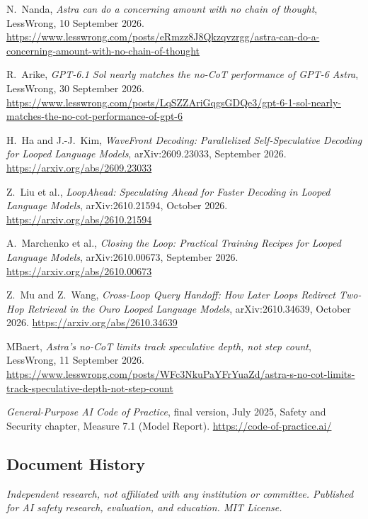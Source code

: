 \documentclass[11pt,letterpaper]{article}
\begin{document}
\begin{enumerate}[label={\textcolor{deepindigo}{[\arabic*]}}, leftmargin=2.6em, itemsep=0.3em]
  \item N.~Nanda, \emph{Astra can do a concerning amount with no chain of thought}, LessWrong, 10 September 2026. \url{https://www.lesswrong.com/posts/eRmzz8J8Qkzqvzrgg/astra-can-do-a-concerning-amount-with-no-chain-of-thought}
  \item R.~Arike, \emph{GPT-6.1 Sol nearly matches the no-CoT performance of GPT-6 Astra}, LessWrong, 30 September 2026. \url{https://www.lesswrong.com/posts/LqSZZAriGqgsGDQe3/gpt-6-1-sol-nearly-matches-the-no-cot-performance-of-gpt-6}
  \item H.~Ha and J.-J.~Kim, \emph{WaveFront Decoding: Parallelized Self-Speculative Decoding for Looped Language Models}, arXiv:2609.23033, September 2026. \url{https://arxiv.org/abs/2609.23033}
  \item Z.~Liu et al., \emph{LoopAhead: Speculating Ahead for Faster Decoding in Looped Language Models}, arXiv:2610.21594, October 2026. \url{https://arxiv.org/abs/2610.21594}
  \item A.~Marchenko et al., \emph{Closing the Loop: Practical Training Recipes for Looped Language Models}, arXiv:2610.00673, September 2026. \url{https://arxiv.org/abs/2610.00673}
  \item Z.~Mu and Z.~Wang, \emph{Cross-Loop Query Handoff: How Later Loops Redirect Two-Hop Retrieval in the Ouro Looped Language Models}, arXiv:2610.34639, October 2026. \url{https://arxiv.org/abs/2610.34639}
  \item MBaert, \emph{Astra's no-CoT limits track speculative depth, not step count}, LessWrong, 11 September 2026. \url{https://www.lesswrong.com/posts/WFc3NkuPaYFrYuaZd/astra-s-no-cot-limits-track-speculative-depth-not-step-count}
  \item \emph{General-Purpose AI Code of Practice}, final version, July 2025, Safety and Security chapter, Measure 7.1 (Model Report). \url{https://code-of-practice.ai/}
\end{enumerate}
\endgroup

\vspace{1.2em}
\subsection*{Document History}


\vspace{1em}
{\small\color{softslate}\emph{Independent research, not affiliated with any institution or committee. Published for AI safety research, evaluation, and education. MIT License.}\par}
\end{document}
